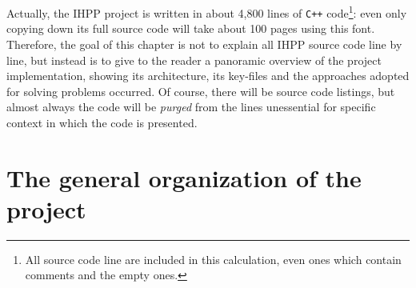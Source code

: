 \documentclass[a4paper,11pt]{report}
\begin{document}
Actually, the IHPP project is written in about 4,800 lines of \verb|C++| 
code\footnote{All source code line are included in this calculation, even ones which 
contain comments and the empty ones.}: 
even only copying down its full source code will take about 100 pages using
this font. Therefore, the goal of this chapter is not to explain 
all IHPP source code line by line, but instead is to give to the reader 
a panoramic overview of the project implementation, showing its architecture, 
its key-files and the approaches adopted for solving problems occurred.
Of course, there will be source code listings, but almost always the code will be
\emph{purged} from the lines unessential for specific context in which the code is presented.

\section{The general organization of the project}
\end{document}
